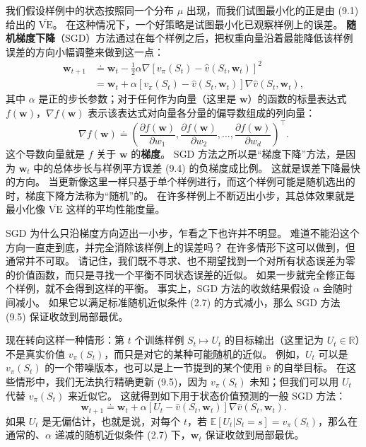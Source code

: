\documentclass[UTF8, 12pt, fontset=fandol, oneside]{ctexart}
\begin{document}
我们假设样例中的状态按照同一个分布 $\mu$ 出现，而我们试图最小化的正是由 (9.1) 给出的 $\overline{\mathrm{VE}}$。
在这种情况下，一个好策略是试图最小化已观察样例上的误差。
\textbf{随机梯度下降}（SGD）方法通过在每个样例之后，把权重向量沿着最能降低该样例误差的方向小幅调整来做到这一点：
\begin{align}
\mathbf{w}_{t+1}
&\doteq \mathbf{w}_t-\frac{1}{2}\alpha\nabla\!\left[v_\pi(S_t)-\hat{v}(S_t,\mathbf{w}_t)\right]^2 \tag{9.4}\\
&= \mathbf{w}_t+\alpha\left[v_\pi(S_t)-\hat{v}(S_t,\mathbf{w}_t)\right]\nabla\hat{v}(S_t,\mathbf{w}_t),
\tag{9.5}
\end{align}
其中 $\alpha$ 是正的步长参数；对于任何作为向量（这里是 $\mathbf{w}$）的函数的标量表达式 $f(\mathbf{w})$，$\nabla f(\mathbf{w})$ 表示该表达式对向量各分量的偏导数组成的列向量：
\begin{equation}
\nabla f(\mathbf{w})\doteq
\left(
\frac{\partial f(\mathbf{w})}{\partial w_1},
\frac{\partial f(\mathbf{w})}{\partial w_2},
\ldots,
\frac{\partial f(\mathbf{w})}{\partial w_d}
\right)^\top.
\tag{9.6}
\end{equation}
这个导数向量就是 $f$ 关于 $\mathbf{w}$ 的\textbf{梯度}。
SGD 方法之所以是“梯度下降”方法，是因为 $\mathbf{w}_t$ 中的总体步长与样例平方误差 (9.4) 的负梯度成比例。
这就是误差下降最快的方向。
当更新像这里一样只基于单个样例进行，而这个样例可能是随机选出的时，梯度下降方法称为“随机”的。
在许多样例上不断迈出小步，其总体效果就是最小化像 $\overline{\mathrm{VE}}$ 这样的平均性能度量。

SGD 为什么只沿梯度方向迈出一小步，乍看之下也许并不明显。
难道不能沿这个方向一直走到底，并完全消除该样例上的误差吗？
在许多情形下这可以做到，但通常并不可取。
请记住，我们既不寻求、也不期望找到一个对所有状态误差为零的价值函数，而只是寻找一个平衡不同状态误差的近似。
如果一步就完全修正每个样例，就不会得到这样的平衡。
事实上，SGD 方法的收敛结果假设 $\alpha$ 会随时间减小。
如果它以满足标准随机近似条件 (2.7) 的方式减小，那么 SGD 方法 (9.5) 保证收敛到局部最优。

现在转向这样一种情形：第 $t$ 个训练样例 $S_t\mapsto U_t$ 的目标输出（这里记为 $U_t\in\mathbb{R}$）不是真实价值 $v_\pi(S_t)$，而只是对它的某种可能随机的近似。
例如，$U_t$ 可以是 $v_\pi(S_t)$ 的一个带噪版本，也可以是上一节提到的某个使用 $\hat{v}$ 的自举目标。
在这些情形中，我们无法执行精确更新 (9.5)，因为 $v_\pi(S_t)$ 未知；但我们可以用 $U_t$ 代替 $v_\pi(S_t)$ 来近似它。
这就得到如下用于状态价值预测的一般 SGD 方法：
\begin{equation}
\mathbf{w}_{t+1}\doteq
\mathbf{w}_t+\alpha\left[U_t-\hat{v}(S_t,\mathbf{w}_t)\right]\nabla\hat{v}(S_t,\mathbf{w}_t).
\tag{9.7}
\end{equation}
如果 $U_t$ 是无偏估计，也就是说，对每个 $t$，若 $\mathbb{E}[U_t|S_t=s]=v_\pi(S_t)$，那么在通常的、$\alpha$ 递减的随机近似条件 (2.7) 下，$\mathbf{w}_t$ 保证收敛到局部最优。
\end{document}
